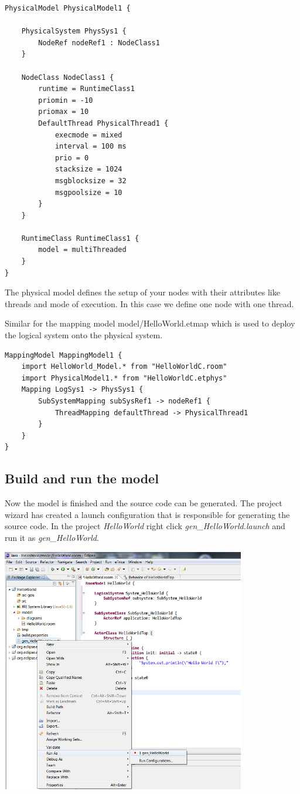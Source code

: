 \begin{lstlisting}[language=etPhys]
PhysicalModel PhysicalModel1 {

	PhysicalSystem PhysSys1 {
		NodeRef nodeRef1 : NodeClass1
	}

	NodeClass NodeClass1 {
		runtime = RuntimeClass1
		priomin = -10
		priomax = 10
		DefaultThread PhysicalThread1 {
			execmode = mixed
			interval = 100 ms
			prio = 0
			stacksize = 1024
			msgblocksize = 32
			msgpoolsize = 10
		}
	}

	RuntimeClass RuntimeClass1 {
		model = multiThreaded
	}
}
\end{lstlisting}

The physical model defines the setup of your nodes with their attributes like threads and mode of execution. In this case we define one node with one thread. 

Similar for the mapping model model/HelloWorld.etmap which is used to deploy the logical system onto the physical system.

\begin{lstlisting}[language=etMap]
MappingModel MappingModel1 {
	import HelloWorld_Model.* from "HelloWorldC.room"
	import PhysicalModel1.* from "HelloWorldC.etphys"
	Mapping LogSys1 -> PhysSys1 {
		SubSystemMapping subSysRef1 -> nodeRef1 {
			ThreadMapping defaultThread -> PhysicalThread1
		}
	}
}
\end{lstlisting}



\subsection{Build and run the model}

Now the model is finished and the source code can be generated. The project wizard has created a launch 
configuration that is responsible for generating the source code. In the project \textit{HelloWorld} right click \emph{gen\_HelloWorld.launch} and run it as \emph{gen\_HelloWorld}. 

\includegraphics[width=0.8\textwidth]{images/015-HelloWorld06.png}

